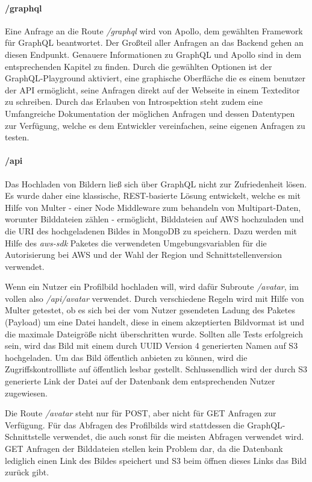 \paragraph{/graphql}
Eine Anfrage an die Route \textit{/graphql} wird von Apollo, dem gewählten Framework für GraphQL beantwortet. Der Großteil aller Anfragen an das Backend gehen an diesen Endpunkt. Genauere Informationen zu GraphQL und Apollo sind in dem entsprechenden Kapitel zu finden. Durch die gewählten Optionen ist der GraphQL-Playground aktiviert, eine graphische Oberfläche die es einem benutzer der API ermöglicht, seine Anfragen direkt auf der Webseite in einem Texteditor zu schreiben. Durch das Erlauben von Introspektion steht zudem eine Umfangreiche Dokumentation der möglichen Anfragen und dessen Datentypen zur Verfügung, welche es dem Entwickler vereinfachen, seine eigenen Anfragen zu testen.

\paragraph{/api}
Das Hochladen von Bildern ließ sich über GraphQL nicht zur Zufriedenheit lösen. Es wurde daher eine klassische, REST-basierte Lösung entwickelt, welche es mit Hilfe von Multer - einer Node Middleware zum behandeln von Multipart-Daten, worunter Bilddateien zählen - ermöglicht, Bilddateien auf AWS hochzuladen und die URI des hochgeladenen Bildes in MongoDB zu speichern. Dazu werden mit Hilfe des \textit{aws-sdk} Paketes die verwendeten Umgebungsvariablen für die Autorisierung bei AWS und der Wahl der Region und Schnittstellenversion verwendet. 

Wenn ein Nutzer ein Profilbild hochladen will, wird dafür Subroute \textit{/avatar}, im vollen also \textit{/api/avatar} verwendet. Durch verschiedene Regeln wird mit Hilfe von Multer getestet, ob es sich bei der vom Nutzer gesendeten Ladung des Paketes (Payload) um eine Datei handelt, diese in einem akzeptierten Bildvormat ist und die maximale Dateigröße nicht überschritten wurde. Sollten alle Tests erfolgreich sein, wird das Bild mit einem durch UUID Version 4 generierten Namen auf S3 hochgeladen. Um das Bild öffentlich anbieten zu können, wird die Zugriffskontrollliste auf öffentlich lesbar gestellt. Schlussendlich wird der durch S3 generierte Link der Datei auf der Datenbank dem entsprechenden Nutzer zugewiesen.

Die Route \textit{/avatar} steht nur für POST, aber nicht für GET Anfragen zur Verfügung. Für das Abfragen des Profilbilds wird stattdessen die GraphQL-Schnittstelle verwendet, die auch sonst für die meisten Abfragen verwendet wird. GET Anfragen der Bilddateien stellen kein Problem dar, da die Datenbank lediglich einen Link des Bildes speichert und S3 beim öffnen dieses Links das Bild zurück gibt.

